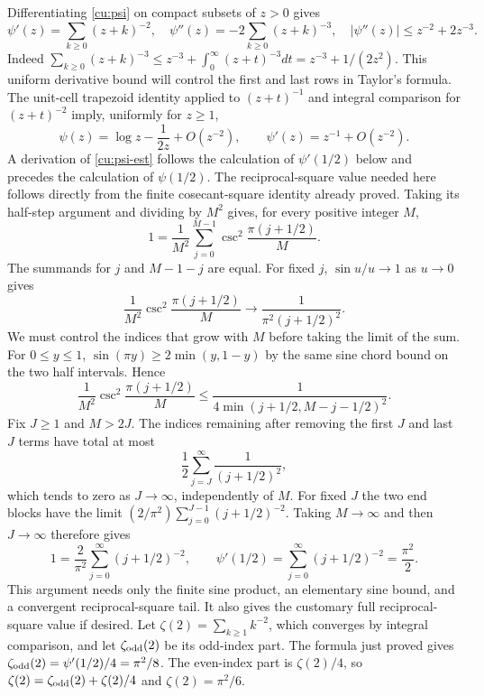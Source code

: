 Differentiating
\eqref{cu:psi} on compact subsets of $z>0$ gives
\[
 \psi'(z)=\sum_{k\geq0}(z+k)^{-2},\quad
 \psi''(z)=-2\sum_{k\geq0}(z+k)^{-3},\quad
 |\psi''(z)|\leq z^{-2}+2z^{-3}.
\]
Indeed $\sum_{k\geq0}(z+k)^{-3}\leq z^{-3}+\int_0^\infty(z+t)^{-3}dt
=z^{-3}+1/(2z^2)$. This uniform derivative bound will control the
first and last rows in Taylor's formula.
The unit-cell trapezoid identity applied to $(z+t)^{-1}$ and integral
comparison for $(z+t)^{-2}$ imply, uniformly for $z\geq1$,
\begin{equation}\label{cu:psi-est}
 \psi(z)=\log z-\frac1{2z}+O(z^{-2}),\qquad
 \psi'(z)=z^{-1}+O(z^{-2}).
\end{equation}
A derivation of \eqref{cu:psi-est} follows the calculation of
$\psi'(1/2)$ below and precedes the calculation of $\psi(1/2)$.
The reciprocal-square value needed here follows directly from
the finite cosecant-square identity already proved. Taking its
half-step argument and dividing by $M^2$ gives, for every positive
integer $M$,
\[
 1=\frac1{M^2}\sum_{j=0}^{M-1}
          \csc^2\frac{\pi(j+1/2)}M.
\]
The summands for $j$ and $M-1-j$ are equal. For fixed $j$,
$\sin u/u\to1$ as $u\to0$ gives
\[
 \frac1{M^2}\csc^2\frac{\pi(j+1/2)}M
             \longrightarrow\frac1{\pi^2(j+1/2)^2}.
\]
We must control the indices that grow with $M$ before taking the
limit of the sum. For $0\leq y\leq1$,
$\sin(\pi y)\geq2\min(y,1-y)$ by the same sine chord bound
on the two half intervals. Hence
\[
 \frac1{M^2}\csc^2\frac{\pi(j+1/2)}M
 \leq\frac1{4\min(j+1/2,M-j-1/2)^2}.
\]
Fix $J\geq1$ and $M>2J$. The indices remaining after removing
the first $J$ and last $J$ terms have total at most
\[
 \frac12\sum_{j=J}^{\infty}\frac1{(j+1/2)^2},
\]
which tends to zero as $J\to\infty$, independently of $M$.
For fixed $J$ the two end blocks have the limit
$(2/\pi^2)\sum_{j=0}^{J-1}(j+1/2)^{-2}$.
Taking $M\to\infty$ and then $J\to\infty$ therefore gives
\[
 1=\frac2{\pi^2}\sum_{j=0}^{\infty}(j+1/2)^{-2},\qquad
 \psi'(1/2)=\sum_{j=0}^{\infty}(j+1/2)^{-2}=\frac{\pi^2}{2}.
\]
This argument needs only the finite sine product, an elementary
sine bound, and a convergent reciprocal-square tail.
It also gives the customary full reciprocal-square value if desired.
Let $\zeta(2)=\sum_{k\geq1}k^{-2}$, which converges by integral
comparison, and let $\zeta_{\rm odd}(2)$ be its odd-index part. The formula just
proved gives $\zeta_{\rm odd}(2)=\psi'(1/2)/4=\pi^2/8$. The even-index
part is $\zeta(2)/4$, so $\zeta(2)=\zeta_{\rm odd}(2)+\zeta(2)/4$ and $\zeta(2)=\pi^2/6$.

